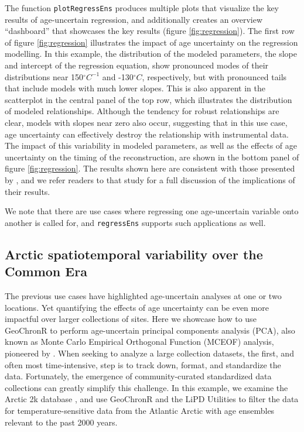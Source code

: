 \documentclass[gchron, manuscript]{copernicus}
\begin{document}
The function \texttt{plotRegressEns} produces multiple plots that visualize the key results of age-uncertain regression, and additionally creates an overview ``dashboard'' that showcases the key results (figure \ref{fig:regression}).
The first row of figure \ref{fig:regression} illustrates the impact of age uncertainty on the regression modelling.
In this example, the distribution of the modeled parameters, the slope and intercept of the regression equation, show pronounced modes of their distributions near 150\(^\circ C^{-1}\) and -130\(^\circ C\), respectively, but with pronounced tails that include models with much lower slopes.
This is also apparent in the scatterplot in the central panel of the top row, which illustrates the distribution of modeled relationships.
Although the tendency for robust relationships are clear, models with slopes near zero also occur, suggesting that in this use case, age uncertainty can effectively destroy the relationship with instrumental data.
The impact of this variability in modeled parameters, as well as the effects of age uncertainty on the timing of the reconstruction, are shown in the bottom panel of figure \ref{fig:regression}.
The results shown here are consistent with those presented by \citet{Boldt2015}, and we refer readers to that study for a full discussion of the implications of their results.

We note that there are use cases where regressing one age-uncertain variable onto another is called for, and \texttt{regressEns} supports such applications as well.

\hypertarget{sec:pca}{%
\subsection{Arctic spatiotemporal variability over the Common Era}\label{sec:pca}}

The previous use cases have highlighted age-uncertain analyses at one or two locations. Yet quantifying the effects of age uncertainty can be even more impactful over larger collections of sites. Here we showcase how to use GeoChronR to perform age-uncertain principal components analysis (PCA), also known as Monte Carlo Empirical Orthogonal Function (MCEOF) analysis, pioneered by \citet{anchukaitis2013mceof}.
When seeking to analyze a large collection datasets, the first, and often most time-intensive, step is to track down, format, and standardize the data.
Fortunately, the emergence of community-curated standardized data collections \citetext{\citealp[e.g.][]{PAGES2K_ngeo2013_short}; \citealp{pages2k2017}; \citealp[ ]{kaufman2020temp12k}; \citealp{konecky2020iso2k}} can greatly simplify this challenge.
In this example, we examine the Arctic 2k database \citep{McKayKaufman2014}, and use GeoChronR and the LiPD Utilities to filter the data for temperature-sensitive data from the Atlantic Arctic with age ensembles relevant to the past 2000 years.
\end{document}
